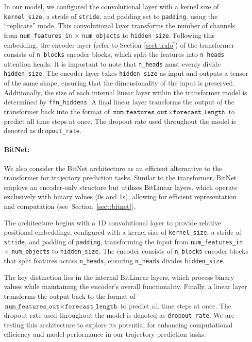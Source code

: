 In our model, we configured the convolutional layer with a kernel size of \texttt{kernel\_size}, a stride of \texttt{stride}, and padding set to \texttt{padding}, using the ``replicate'' mode. This convolutional layer transforms the number of channels from \texttt{num\_features\_in} $\times$ \texttt{num\_objects} to \texttt{hidden\_size}. Following this embedding, the encoder layer (refer to Section \ref{sect:trafo}) of the transformer consists of \texttt{n\_blocks} encoder blocks, which split the features into \texttt{n\_heads} attention heads. It is important to note that \texttt{n\_heads} must evenly divide \texttt{hidden\_size}. The encoder layer takes \texttt{hidden\_size} as input and outputs a tensor of the same shape, ensuring that the dimensionality of the input is preserved. Additionally, the size of each internal linear layer within the transformer model is determined by \texttt{ffn\_hiddens}. A final linear layer transforms the output of the transformer back into the format of $\texttt{num\_features\_out} \times \texttt{forecast\_length}$ to predict all time steps at once. The dropout rate used throughout the model is denoted as \texttt{dropout\_rate}.

\paragraph{BitNet:}
\label{sec:bitnet-details}

We also consider the BitNet architecture as an efficient alternative to the transformer for trajectory prediction tasks. Similar to the transformer, BitNet employs an encoder-only structure but utilizes BitLinear layers, which operate exclusively with binary values (0s and 1s), allowing for efficient representation and computation (see~Section~\ref{sect:bitnet}).

The architecture begins with a 1D convolutional layer to provide relative positional embeddings, configured with a kernel size of \texttt{kernel\_size}, a stride of \texttt{stride}, and padding of \texttt{padding}, transforming the input from \texttt{num\_features\_in} $\times$ \texttt{num\_objects} to \texttt{hidden\_size}. The encoder consists of \texttt{n\_blocks} encoder blocks that split features across \texttt{n\_heads}, ensuring \texttt{n\_heads} divides \texttt{hidden\_size}.

The key distinction lies in the internal BitLinear layers, which process binary values while maintaining the encoder's overall functionality. Finally, a linear layer transforms the output back to the format of $\texttt{num\_features\_out} \times \texttt{forecast\_length}$ to predict all time steps at once. The dropout rate used throughout the model is denoted as \texttt{dropout\_rate}. We are testing this architecture to explore its potential for enhancing computational efficiency and model performance in our trajectory prediction tasks.


